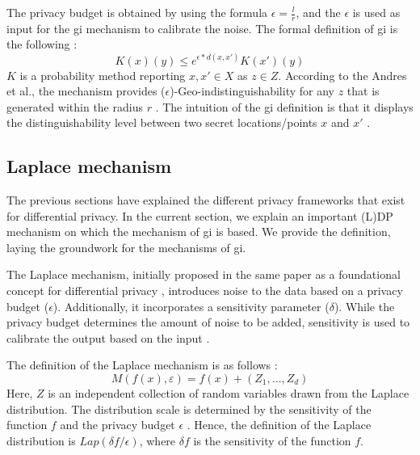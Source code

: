 The privacy budget is obtained by using the formula $\epsilon = \frac{l}{r}$, and the $\epsilon$ is used as input for the \gls{gi} mechanism to calibrate the noise. \newline
The formal definition of \gls{gi} is the following \citep{DBLP:journals/corr/abs-1212-1984}:
\begin{equation}
  K(x)(y) \le e^{\epsilon * d(x,x')} K(x')(y)
  \label{algo:2d-geo-indistinguishability}
\end{equation}
$K$ is a probability method reporting $x, x' \in X$ as $z \in Z$.
According to the Andres et al., the mechanism provides ($\epsilon$)-Geo-indistinguishability for any $z$ that is generated within the radius $r$ \citep{DBLP:journals/corr/abs-1212-1984}.
The intuition of the \gls{gi} definition is that it displays the distinguishability level between two secret locations/points $x$ and $x'$ \citep{chatzikokolakis_constructing_2015}.
\subsection{Laplace mechanism} \label{theory:laplace}
The previous sections have explained the different privacy frameworks that exist for differential privacy.
In the current section, we explain an important (L)DP mechanism on which the mechanism of \gls{gi} is based.
We provide the definition, laying the groundwork for the mechanisms of \gls{gi}.

The Laplace mechanism, initially proposed in the same paper as a foundational concept for differential privacy \citep{dwork_differential_2006},
introduces noise to the data based on a privacy budget ($\epsilon$).
Additionally, it incorporates a sensitivity parameter ($\delta$).
While the privacy budget determines the amount of noise to be added, sensitivity is used to calibrate the output based on the input \citep{del_rey_comprehensive_2020}.

The definition of the Laplace mechanism is as follows \citep{del_rey_comprehensive_2020}:
\begin{equation}
  M\left(f\left(x\right),\varepsilon\right)=f\left(x\right)+\left(Z_{1},\ldots,Z_{d}\right)
\end{equation}
Here, $Z$ is an independent collection of random variables drawn from the Laplace distribution.
The distribution scale is determined by the sensitivity of the function $f$ and the privacy budget $\epsilon$ \citep{del_rey_comprehensive_2020}.
Hence, the definition of the Laplace distribution is $Lap(\delta f/\epsilon)$, where $\delta f$ is the sensitivity of the function $f$. \newline

